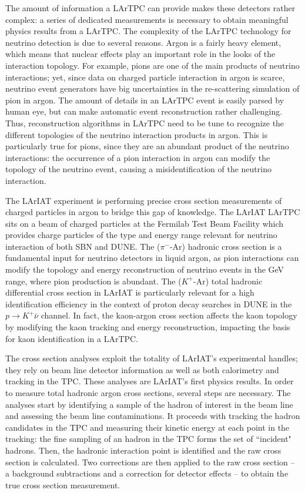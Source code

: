 The amount of information a LArTPC can provide makes these detectors rather complex: a series of dedicated measurements is necessary to obtain meaningful physics results from a LArTPC. The complexity of the LArTPC technology for neutrino detection is due to several reasons. Argon is a fairly heavy element, which means that nuclear effects play an important role in the looks of the interaction topology. For example, pions are one of the main products of neutrino interactions; yet,  since data on charged particle interaction in argon is scarce, neutrino event generators have big uncertainties in the re-scattering simulation of pion in argon. %
The amount of details in an LArTPC event is easily  parsed by human eye, but can make automatic event reconstruction rather challenging. Thus, reconstruction algorithms in LArTPC need to be tune to recognize the different topologies of the neutrino interaction products in argon. This is particularly true for pions, since they are an abundant product of the neutrino interactions: the occurrence of a pion interaction in argon can modify the topology of the neutrino event, causing a misidentification of the neutrino interaction.

The LArIAT \cite{Cavanna:2014iqa} experiment is performing precise cross section measurements of charged particles in argon to bridge this gap of knowledge. 
The LArIAT LArTPC sits on a beam of charged particles at the Fermilab Test Beam Facility which provides charge particles of the type and energy range relevant for neutrino interaction of both SBN and DUNE. The ($\pi^-$-Ar) hadronic cross section is a fundamental input for neutrino detectors in liquid argon, as pion interactions can modify the topology and energy reconstruction of neutrino events in the GeV range, where pion production is abundant. The  ($K^+$-Ar) total hadronic differential cross section in LArIAT is particularly relevant for a high identification efficiency in the context of proton decay searches in DUNE in the  $p\rightarrow K^+\bar{\nu}$  channel. In fact, the kaon-argon cross section affects the kaon topology by modifying the kaon tracking and energy reconstruction, impacting the basis for kaon identification in a LArTPC.  

The cross section analyses exploit the totality of LArIAT's experimental handles; they rely on beam line detector information as well as both calorimetry and tracking in the TPC. These analyses are LArIAT's first physics results. 
In order to measure total hadronic  argon cross sections, several steps are necessary. The analyses start by identifying a sample of the hadron of interest in the beam line and assessing the beam line contaminations. It proceeds with tracking the hadron candidates in the TPC and measuring their kinetic energy at each point in the tracking: the fine sampling of an hadron in the TPC forms the set of ``incident" hadrons.  Then, the hadronic interaction point is identified and the raw cross section is calculated. Two corrections are then applied to the raw cross section -- a background subtractions and a correction for detector effects -- to obtain the true cross section measurement.\\

